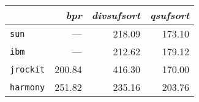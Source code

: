 \begin{tabular}{l r r r } \toprule
 & \emph{bpr} & \emph{divsufsort} & \emph{qsufsort} \\ \midrule
\texttt{sun} & --- & 218.09 & 173.10  \\
\texttt{ibm} & --- & 212.62 & 179.12 \\
\texttt{jrockit} & 200.84 & 416.30 & 170.00 \\
\texttt{harmony} & 251.82 & 235.16 & 203.76 \\
\bottomrule
\end{tabular}

